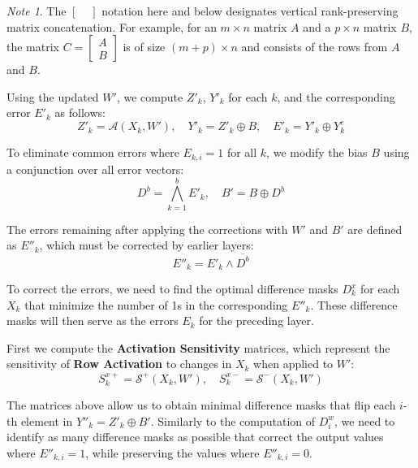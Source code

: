 \documentclass{article}
\theoremstyle{definition}
\theoremstyle{remark}
\newtheorem*{note}{Note}
\begin{document}
\begin{note}
    The \(\begin{bmatrix}\,\,\end{bmatrix}\) notation here and below designates vertical rank-preserving matrix concatenation. For example, for an \( m \times n \) matrix \( A \) and a \( p \times n \) matrix \( B \), the matrix \( C = \begin{bmatrix} A \\ B \end{bmatrix} \) is of size \( (m+p) \times n \) and consists of the rows from \( A \) and \( B \).
\end{note}

Using the updated \( W' \), we compute \( Z'_k \), \( Y'_k \) for each \( k \), and the corresponding error \( E'_k \) as follows:
\[
    Z'_k = \mathcal{A}(X_k, W'),\quad Y'_k = Z'_k \oplus B,\quad E'_k = Y'_k \oplus Y^e_k
\]

To eliminate common errors where \( E_{k,i} = 1 \) for all \( k \), we modify the bias \( B \) using a conjunction over all error vectors:
\[
    D^b = \bigwedge_{k=1}^b E'_k,\quad B' = B \oplus D^b
\]

The errors remaining after applying the corrections with \( W' \) and \( B' \) are defined as \( E''_k \), which must be corrected by earlier layers:
\[
    E''_k = E'_k \wedge \overline{D^b}
\]

To correct the errors, we need to find the optimal difference masks \( D^x_k \) for each \( X_k \) that minimize the number of 1s in the corresponding \( E''_k \). These difference masks will then serve as the errors \( E_k \) for the preceding layer.

First we compute the \textbf{Activation Sensitivity} matrices, which represent the sensitivity of \textbf{Row Activation} to changes in \( X_k \) when applied to \( W' \):
\[
    S^{x+}_k = \mathcal{S^+}(X_k, W'),\quad
    S^{x-}_k = \mathcal{S^-}(X_k, W')
\]

The matrices above allow us to obtain minimal difference masks that flip each \( i \)-th element in \( Y''_k = Z'_k \oplus B' \). Similarly to the computation of \( D^w_i \), we need to identify as many difference masks as possible that correct the output values where \( E''_{k,i} = 1 \), while preserving the values where \( E''_{k,i} = 0 \).
\end{document}
